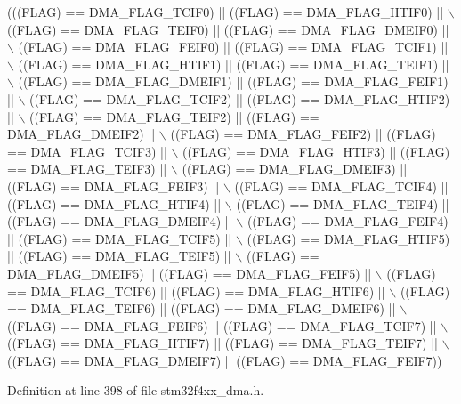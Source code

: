 \begin{DoxyCode}
(((FLAG) == DMA\_FLAG\_TCIF0)  || ((FLAG) == DMA\_FLAG\_HTIF0)  || \(\backslash\)
                               ((FLAG) == DMA\_FLAG\_TEIF0)  || ((FLAG) == DMA\_FLAG\_DMEIF0) || \(\backslash\)
                               ((FLAG) == DMA\_FLAG\_FEIF0)  || ((FLAG) == DMA\_FLAG\_TCIF1)  || \(\backslash\)
                               ((FLAG) == DMA\_FLAG\_HTIF1)  || ((FLAG) == DMA\_FLAG\_TEIF1)  || \(\backslash\)
                               ((FLAG) == DMA\_FLAG\_DMEIF1) || ((FLAG) == DMA\_FLAG\_FEIF1)  || \(\backslash\)
                               ((FLAG) == DMA\_FLAG\_TCIF2)  || ((FLAG) == DMA\_FLAG\_HTIF2)  || \(\backslash\)
                               ((FLAG) == DMA\_FLAG\_TEIF2)  || ((FLAG) == DMA\_FLAG\_DMEIF2) || \(\backslash\)
                               ((FLAG) == DMA\_FLAG\_FEIF2)  || ((FLAG) == DMA\_FLAG\_TCIF3)  || \(\backslash\)
                               ((FLAG) == DMA\_FLAG\_HTIF3)  || ((FLAG) == DMA\_FLAG\_TEIF3)  || \(\backslash\)
                               ((FLAG) == DMA\_FLAG\_DMEIF3) || ((FLAG) == DMA\_FLAG\_FEIF3)  || \(\backslash\)
                               ((FLAG) == DMA\_FLAG\_TCIF4)  || ((FLAG) == DMA\_FLAG\_HTIF4)  || \(\backslash\)
                               ((FLAG) == DMA\_FLAG\_TEIF4)  || ((FLAG) == DMA\_FLAG\_DMEIF4) || \(\backslash\)
                               ((FLAG) == DMA\_FLAG\_FEIF4)  || ((FLAG) == DMA\_FLAG\_TCIF5)  || \(\backslash\)
                               ((FLAG) == DMA\_FLAG\_HTIF5)  || ((FLAG) == DMA\_FLAG\_TEIF5)  || \(\backslash\)
                               ((FLAG) == DMA\_FLAG\_DMEIF5) || ((FLAG) == DMA\_FLAG\_FEIF5)  || \(\backslash\)
                               ((FLAG) == DMA\_FLAG\_TCIF6)  || ((FLAG) == DMA\_FLAG\_HTIF6)  || \(\backslash\)
                               ((FLAG) == DMA\_FLAG\_TEIF6)  || ((FLAG) == DMA\_FLAG\_DMEIF6) || \(\backslash\)
                               ((FLAG) == DMA\_FLAG\_FEIF6)  || ((FLAG) == DMA\_FLAG\_TCIF7)  || \(\backslash\)
                               ((FLAG) == DMA\_FLAG\_HTIF7)  || ((FLAG) == DMA\_FLAG\_TEIF7)  || \(\backslash\)
                               ((FLAG) == DMA\_FLAG\_DMEIF7) || ((FLAG) == DMA\_FLAG\_FEIF7))
\end{DoxyCode}


Definition at line 398 of file stm32f4xx\-\_\-dma.\-h.


